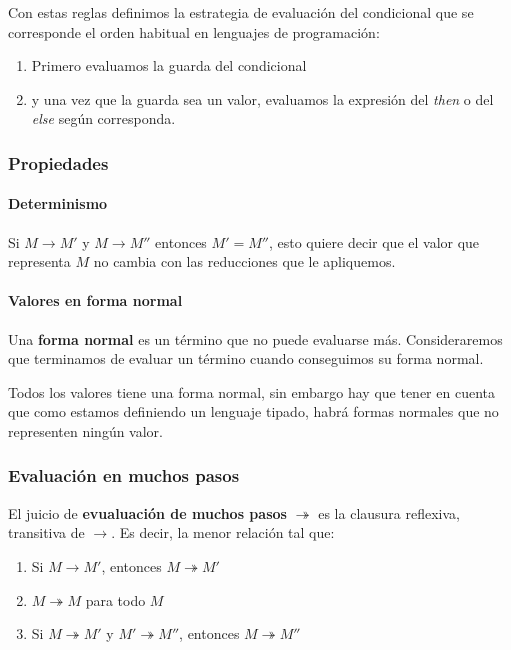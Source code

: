 Con estas reglas definimos la estrategia de evaluación del condicional que se corresponde el orden habitual en lenguajes de programación:
\begin{enumerate}
    \item Primero evaluamos la guarda del condicional
    \item y una vez que la guarda sea un valor, evaluamos la expresión del \textit{then} o del \textit{else} según corresponda.
\end{enumerate}

\subsubsection{Propiedades}

\paragraph{Determinismo} Si $M\to M'$ y $M\to M''$ entonces $M' = M''$, esto quiere decir que el valor que representa $M$ no cambia con las reducciones que le apliquemos.

\paragraph{Valores en forma normal} Una \textbf{forma normal} es un término que no puede evaluarse más. Consideraremos que terminamos de evaluar un término cuando conseguimos su forma normal.

Todos los valores tiene una forma normal, sin embargo hay que tener en cuenta que como estamos definiendo un lenguaje tipado, habrá formas normales que no representen ningún valor.

\subsubsection{Evaluación en muchos pasos}
El juicio de \textbf{evualuación de muchos pasos} $\twoheadrightarrow$ es la clausura reflexiva, transitiva de $\to$. Es decir, la menor relación tal que:
\begin{enumerate}
    \item Si $M\to M'$, entonces $M\twoheadrightarrow M'$
    \item $M\twoheadrightarrow M$ para todo $M$
    \item Si $M\twoheadrightarrow M'$ y $M' \twoheadrightarrow M''$, entonces $M\twoheadrightarrow M''$
\end{enumerate}

